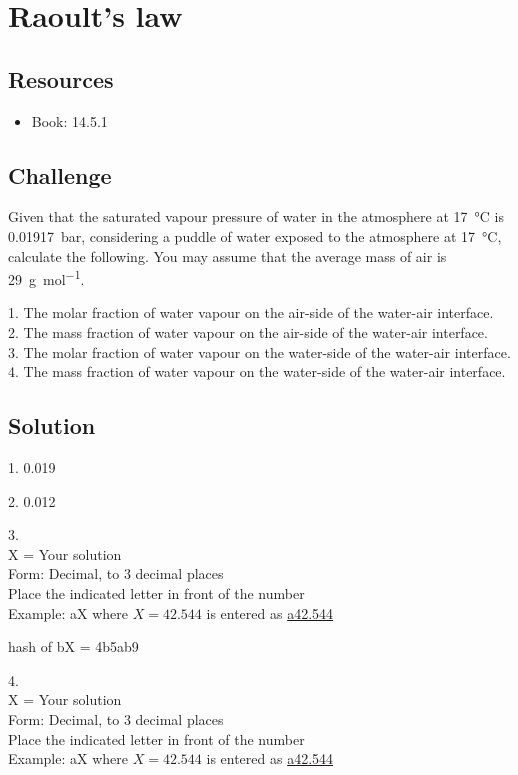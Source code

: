\newpage
\section{Raoult's law}

\subsection*{Resources}
\begin{itemize}
    \item Book: 14.5.1
\end{itemize}

\subsection*{Challenge}
Given that the saturated vapour pressure of water in the atmosphere at \SI{17}{\celsius} is \SI{0.01917}{\bar}, considering a puddle of water exposed to the atmosphere at \SI{17}{\celsius}, calculate the following. You may assume that the average mass of air is \SI{29}{\gram\per\mol}.

1. The molar fraction of water vapour on the air-side of the water-air interface.\\
2. The mass fraction of water vapour on the air-side of the water-air interface.\\
3. The molar fraction of water vapour on the water-side of the water-air interface.\\
4. The mass fraction of water vapour on the water-side of the water-air interface.

\subsection*{Solution}
1. \num{0.019}

2. \num{0.012}

3.\\
X = Your solution\\
Form: Decimal, to 3 decimal places\\
Place the indicated letter in front of the number\\
Example: aX where $X=42.544$ is entered as \href{http://www.wolframalpha.com/input/?i=md5+hash+of+\%22a42.544\%22}{a42.544}

hash of bX = 4b5ab9

4.\\
X = Your solution\\
Form: Decimal, to 3 decimal places\\
Place the indicated letter in front of the number\\
Example: aX where $X=42.544$ is entered as \href{http://www.wolframalpha.com/input/?i=md5+hash+of+\%22a42.544\%22}{a42.544}

